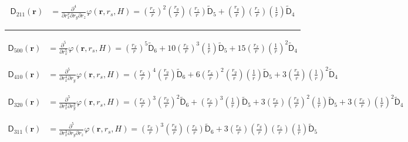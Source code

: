 \begin{align}
  \mathsf{D}_{211}(\mathbf{r}) &= \frac{\partial^4}{\partial r_x^2
    \partial r_y   \partial r_z} \varphi (\mathbf{r}, r_s, H) =
    \left(\frac{r_x}{r}\right)^2\left(\frac{r_y}{r}\right)\left(\frac{r_z}{r}\right) \mathsf{\tilde{D}}_{5} +
    \left(\frac{r_y}{r}\right)\left(\frac{r_z}{r}\right)\left(\frac{1}{r}\right) \mathsf{\tilde{D}}_{4}
  \nonumber
\end{align}

\noindent\rule{6cm}{0.4pt}
\begin{align}
  \mathsf{D}_{500}(\mathbf{r}) &= \frac{\partial^5}{\partial r_x^5}
  \varphi (\mathbf{r}, r_s, H) =
  \left(\frac{r_x}{r}\right)^5 \mathsf{\tilde{D}}_{6} +
  10\left(\frac{r_x}{r}\right)^3\left(\frac{1}{r}\right)\mathsf{\tilde{D}}_{5} +
  15\left(\frac{r_x}{r}\right)\left(\frac{1}{r}\right)^2\mathsf{\tilde{D}}_{4}
  \nonumber
\end{align}

\begin{align}
  \mathsf{D}_{410}(\mathbf{r}) &= \frac{\partial^5}{\partial r_x^4
    \partial r_y} \varphi (\mathbf{r}, r_s, H) =
  \left(\frac{r_x}{r}\right)^4 \left(\frac{r_y}{r}\right) \mathsf{\tilde{D}}_{6} +
  6 \left(\frac{r_x}{r}\right)^2 \left(\frac{r_y}{r}\right)\left(\frac{1}{r}\right) \mathsf{\tilde{D}}_{5} + 
  3 \left(\frac{r_y}{r}\right) \left(\frac{1}{r}\right)^2\mathsf{\tilde{D}}_{4}
  \nonumber
\end{align}

\begin{align}
  \mathsf{D}_{320}(\mathbf{r}) &= \frac{\partial^5}{\partial r_x^3
    \partial r_y^2} \varphi (\mathbf{r}, r_s, H) =
  \left(\frac{r_x}{r}\right)^3 \left(\frac{r_y}{r}\right)^2 \mathsf{\tilde{D}}_{6} +
  \left(\frac{r_x}{r}\right)^3 \left(\frac{1}{r}\right)\mathsf{\tilde{D}}_{5} +
  3 \left(\frac{r_x}{r}\right) \left(\frac{r_y}{r}\right)^2 \left(\frac{1}{r}\right)\mathsf{\tilde{D}}_{5} + 
  3 \left(\frac{r_x}{r}\right) \left(\frac{1}{r}\right)^2\mathsf{\tilde{D}}_{4}
  \nonumber
\end{align}

\begin{align}
  \mathsf{D}_{311}(\mathbf{r}) &= \frac{\partial^5}{\partial r_x^3
    \partial r_y \partial r_z} \varphi (\mathbf{r}, r_s, H) =
  \left(\frac{r_x}{r}\right)^3 \left(\frac{r_y}{r}\right) \left(\frac{r_z}{r}\right) \mathsf{\tilde{D}}_{6} +
  3 \left(\frac{r_x}{r}\right) \left(\frac{r_y}{r}\right) \left(\frac{r_z}{r}\right) \left(\frac{1}{r}\right)\mathsf{\tilde{D}}_{5}
  \nonumber
\end{align}

